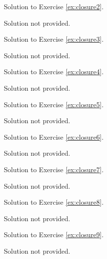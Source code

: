 Solution to Exercise \ref{ex:closure2}.


    Solution not provided.
    

\newpage

Solution to Exercise \ref{ex:closure3}.


    Solution not provided.
    

\newpage

Solution to Exercise \ref{ex:closure4}.


    Solution not provided.
    

\newpage

Solution to Exercise \ref{ex:closure5}.


    Solution not provided.
    

\newpage

Solution to Exercise \ref{ex:closure6}.


    Solution not provided.
    

\newpage

Solution to Exercise \ref{ex:closure7}.


    Solution not provided.
    

\newpage

Solution to Exercise \ref{ex:closure8}.


    Solution not provided.
    

\newpage

Solution to Exercise \ref{ex:closure9}.


    Solution not provided.
    

\newpage

